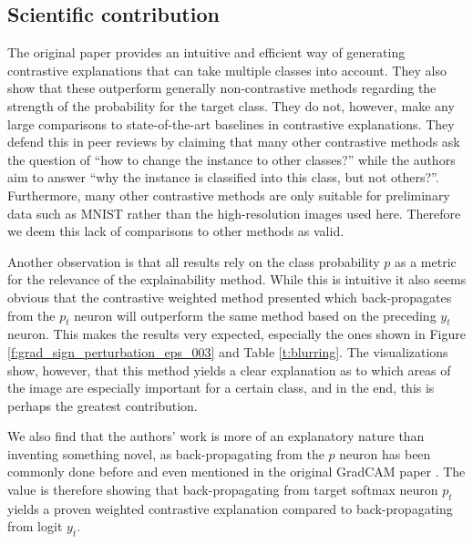\subsection{Scientific contribution}
The original paper provides an intuitive and efficient way of generating contrastive explanations that can take multiple classes into account. They also show that these outperform generally non-contrastive methods regarding the strength of the probability for the target class. They do not, however, make any large comparisons to state-of-the-art baselines in contrastive explanations. They defend this in peer reviews by claiming that many other contrastive methods ask the question of “how to change the instance to other classes?” while the authors aim to answer “why the instance is classified into this class, but not others?”. Furthermore, many other contrastive methods are only suitable for preliminary data such as MNIST rather than the high-resolution images used here. Therefore we deem this lack of comparisons to other methods as valid.

Another observation is that all results rely on the class probability $p$ as a metric for the relevance of the explainability method. While this is intuitive it also seems obvious that the contrastive weighted method presented which back-propagates from the $p_t$ neuron will outperform the same method based on the preceding $y_t$ neuron. This makes the results very expected, especially the ones shown in Figure \ref{f:grad_sign_perturbation_eps_003} and Table \ref{t:blurring}. The visualizations show, however, that this method yields a clear explanation as to which areas of the image are especially important for a certain class, and in the end, this is perhaps the greatest contribution. 

We also find that the authors' work is more of an explanatory nature than inventing something novel, as back-propagating from the $p$ neuron has been commonly done before and even mentioned in the original GradCAM paper \citep{gradcam}. The value is therefore showing that back-propagating from target softmax neuron $p_t$ yields a proven weighted contrastive explanation compared to back-propagating from logit $y_t$. 

